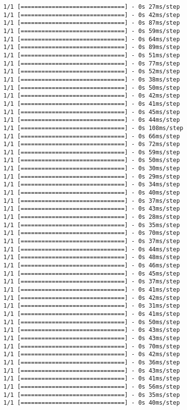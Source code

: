 \documentclass[11pt]{article}
\begin{document}
\begin{Verbatim}[commandchars=\\\{\}]
1/1 [==============================] - 0s 27ms/step
1/1 [==============================] - 0s 42ms/step
1/1 [==============================] - 0s 87ms/step
1/1 [==============================] - 0s 59ms/step
1/1 [==============================] - 0s 64ms/step
1/1 [==============================] - 0s 89ms/step
1/1 [==============================] - 0s 51ms/step
1/1 [==============================] - 0s 77ms/step
1/1 [==============================] - 0s 52ms/step
1/1 [==============================] - 0s 38ms/step
1/1 [==============================] - 0s 50ms/step
1/1 [==============================] - 0s 42ms/step
1/1 [==============================] - 0s 41ms/step
1/1 [==============================] - 0s 45ms/step
1/1 [==============================] - 0s 44ms/step
1/1 [==============================] - 0s 108ms/step
1/1 [==============================] - 0s 66ms/step
1/1 [==============================] - 0s 72ms/step
1/1 [==============================] - 0s 59ms/step
1/1 [==============================] - 0s 50ms/step
1/1 [==============================] - 0s 30ms/step
1/1 [==============================] - 0s 29ms/step
1/1 [==============================] - 0s 34ms/step
1/1 [==============================] - 0s 40ms/step
1/1 [==============================] - 0s 37ms/step
1/1 [==============================] - 0s 43ms/step
1/1 [==============================] - 0s 28ms/step
1/1 [==============================] - 0s 35ms/step
1/1 [==============================] - 0s 70ms/step
1/1 [==============================] - 0s 37ms/step
1/1 [==============================] - 0s 44ms/step
1/1 [==============================] - 0s 48ms/step
1/1 [==============================] - 0s 46ms/step
1/1 [==============================] - 0s 45ms/step
1/1 [==============================] - 0s 37ms/step
1/1 [==============================] - 0s 41ms/step
1/1 [==============================] - 0s 42ms/step
1/1 [==============================] - 0s 31ms/step
1/1 [==============================] - 0s 41ms/step
1/1 [==============================] - 0s 50ms/step
1/1 [==============================] - 0s 43ms/step
1/1 [==============================] - 0s 43ms/step
1/1 [==============================] - 0s 70ms/step
1/1 [==============================] - 0s 42ms/step
1/1 [==============================] - 0s 36ms/step
1/1 [==============================] - 0s 43ms/step
1/1 [==============================] - 0s 41ms/step
1/1 [==============================] - 0s 56ms/step
1/1 [==============================] - 0s 35ms/step
1/1 [==============================] - 0s 40ms/step

\end{Verbatim}
\end{document}
